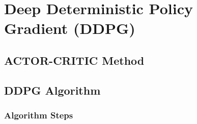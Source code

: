 \chapter{Deep Deterministic Policy Gradient (DDPG)}

\section{ACTOR-CRITIC Method}

\section{DDPG Algorithm}

\subsection{Algorithm Steps}